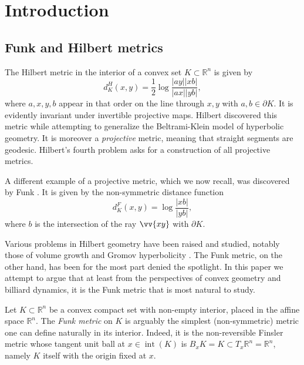 \documentclass[reqno,10pt]{amsart}
\newcounter{mp}
\DeclareMathOperator{\inter}{int}
\newcommand{\R}{\mathbb{R}}
\begin{document}
	\maketitle
		\tableofcontents
	
	\section{Introduction}
	
	\subsection{Funk and Hilbert metrics}
	
	The Hilbert metric in the interior of a convex set $K\subset\mathbb R^n$ is given by $$d^H_K(x,y)=\frac12 \log \frac{|ay||xb|}{|ax||yb|}, $$ where $a,x,y,b$ appear in that order on the line through $x,y$ with $a,b\in\partial K$. It is evidently invariant under invertible projective maps. Hilbert discovered this metric while attempting to generalize the Beltrami-Klein model of hyperbolic geometry. It is moreover a \emph{projective} metric, meaning that straight segments are geodesic. Hilbert's fourth problem \cite{hilbert_problems} asks for a construction of all projective metrics.
	
	A different example of a projective metric, which we now recall, was discovered by Funk \cite{funk}. It is given by the non-symmetric distance function $$d^F_K(x,y)=\log\frac{|xb|}{|yb|},$$ where $b$ is the intersection of the ray $\vv{xy}$ with $\partial K$. 
	
	Various problems in Hilbert geometry have been raised and studied, notably those of volume growth \cite{colbois_verovic, vernicos_polytopes, berck_bernig_vernicos, tholozan} and Gromov hyperbolicity \cite{benoist}. The Funk metric, on the other hand, has been for the most part denied the spotlight. In this paper we attempt to argue that at least from the perspectives of convex geometry and billiard dynamics, it is the Funk metric that is most natural to study.
	
	Let $K\subset \R^n$ be a convex compact set with non-empty interior, placed in the affine space $\R^n$. The \emph{Funk metric} on $K$ is arguably the simplest (non-symmetric) metric one can define naturally in its interior. Indeed, it is the non-reversible Finsler metric whose tangent unit ball at $x\in \inter(K)$ is $B_xK=K\subset T_x\R^n=\R^n$, namely $K$ itself with the origin fixed at $x$. 
	
\end{document}
